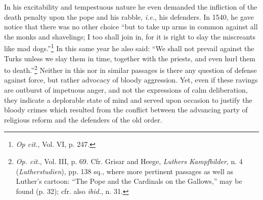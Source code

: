 In his excitability and tempestuous nature he even demanded the
infliction of the death penalty upon the pope and his rabble, \textit{i.e.},
his defenders. In 1540, he gave notice that there was no other choice
“but to take up arms in common against all the monks and shavelings;
I too shall join in, for it is right to slay the miscreants like mad
dogs.”\footnote{\textit{Op cit.}, Vol. VI, p. 247.}
 In this same year he also said: “We shall not prevail against
the Turks unless we slay them in time, together with the priests, and
even hurl them to death.”\footnote
{\textit{Op. cit.}, Vol. III, p. 69. Cfr. Grisar and Heege, \textit{Luthers Kampfbilder}, n. 4 (\textit{Lutherstudien}),
pp. 138 sq., where more pertinent passages as well as Luther’s cartoon: “The Pope
and the Cardinals on the Gallows,” may be found (p. 32); cfr. also \textit{ibid.}, n. 31.}
Neither in this nor in similar passages
is there any question of defense against force, but rather advocacy
of bloody aggression. Yet, even if these ravings are outburst of impetuous
anger, and not the expressions of calm deliberation, they
indicate a deplorable state of mind and served upon occasion to
justify the bloody crimes which resulted from the conflict between
the advancing party of religious reform and the defenders of the
old order.
